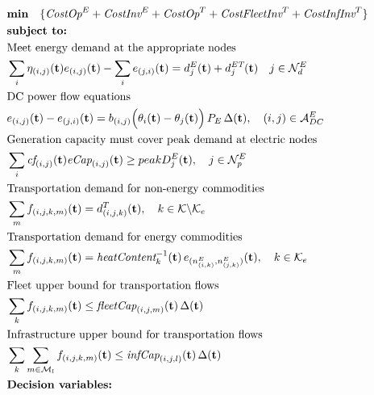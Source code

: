 \documentclass{article}
\begin{document}
{\allowdisplaybreaks
\begin{align}
& \textbf{min}\quad \{ \emph{CostOp}^E+\emph{CostInv}^E + \emph{CostOp}^T + \emph{CostFleetInv}^T + \emph{CostInfInv}^T \} \label{eqn:objectives} \\
& \textbf{subject to:} \nonumber \\
& \text{Meet energy demand at the appropriate nodes} \nonumber \\
& \sum_i{\eta_{(i,j)}(\textbf{t}) e_{(i,j)}(\textbf{t})} - \sum_i{e_{(j,i)}(\textbf{t})} = d^E_j(\textbf{t}) + d^\emph{ET}_j(\textbf{t}) \quad j \in \mathcal{N}^E_d \label{eqn:Edemand} \\
& \text{DC power flow equations} \nonumber \\
& e_{(i,j)}(\textbf{t}) - e_{(j,i)}(\textbf{t}) = b_{(i,j)} \Big( \theta_i(\textbf{t}) - \theta_j(\textbf{t}) \Big) \, P_E \, \Delta(\textbf{t}), \quad (i,j) \in \mathcal{A}^E_{DC} \label{eqn:DCpowerflow} \\
& \text{Generation capacity must cover peak demand at electric nodes} \nonumber \\
& \sum_i{\emph{cf}_{(i,j)}(\textbf{t}) \emph{eCap}_{(i,j)}(\textbf{t})} \ge peakD^E_j(\textbf{t}), \quad j \in \mathcal{N}^E_p \label{eqn:Epeak} \\
& \text{Transportation demand for non-energy commodities} \nonumber \\
& \sum_m{f_{(i,j,k,m)}(\textbf{t})} = d^T_{(i,j,k)}(\textbf{t}), \quad k \in \mathcal{K} \char`\\ \mathcal{K}_e \label{eqn:Tdemand} \\
& \text{Transportation demand for energy commodities} \nonumber \\
& \sum_m{f_{(i,j,k,m)}(\textbf{t})} = \emph{heatContent}^{-1}_k(\textbf{t}) \, e_{(n^E_{(i,k)},n^E_{(j,k)})}(\textbf{t}), \quad k \in \mathcal{K}_e \label{eqn:Tcarrier} \\
& \text{Fleet upper bound for transportation flows} \nonumber \\
& \sum_k{f_{(i,j,k,m)}(\textbf{t})} \le \emph{fleetCap}_{(i,j,m)}(\textbf{t}) \, \Delta(\textbf{t}) \label{eqn:Tfleet} \\
& \text{Infrastructure upper bound for transportation flows} \nonumber \\
& \sum_k{ \sum_{m \in \mathcal{M}_l }{ f_{(i,j,k,m)}(\textbf{t}) } } \le \emph{infCap}_{(i,j,l)}(\textbf{t}) \, \Delta(\textbf{t}) \label{eqn:Tinf} \\
& \textbf{Decision variables:} \nonumber \\

\end{align}}
\end{document}
